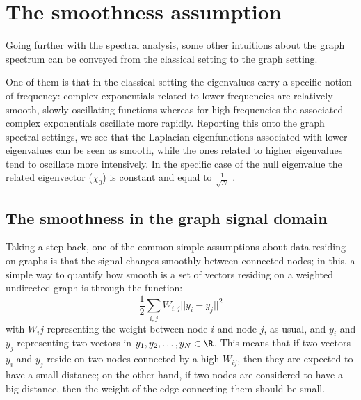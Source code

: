 \chapter{The smoothness assumption}
\label{ch:smoothness}
Going further with the spectral analysis, some other intuitions about the graph spectrum can be conveyed from the classical setting to the graph setting.

One of them is that in the classical setting the eigenvalues carry a specific notion of frequency: complex exponentials related to lower frequencies are relatively smooth, slowly oscillating functions whereas for high frequencies the associated complex exponentials oscillate more rapidly. Reporting this onto the graph spectral settings, we see that the Laplacian eigenfunctions associated with lower eigenvalues can be seen as smooth, while the ones related to higher eigenvalues tend to oscillate more intensively. \cite{Shuman2016} In the specific case of the null eigenvalue  the related eigenvector ($\chi_0$) is constant and equal to $\frac{1}{\sqrt{N}}$ \cite{Shuman2013}.
\section{The smoothness in the graph signal domain}
Taking a step back, one of the common simple assumptions about data residing on graphs is that the signal changes smoothly between connected nodes; in this, a simple way to quantify how smooth is a set of vectors residing on a weighted undirected graph is through the function:
\begin{equation}
\frac{1}{2} \sum_{i,j}W_{i,j}||y_i - y_j||^2
\label{eq:smooth}
\end{equation}
with $W_ij$ representing the weight between node $i$ and node $j$, as usual, and $y_i$ and $y_j$ representing two vectors in $y_1, y_2, \dots, y_N \in \R$. This means that if two vectors $y_i$ and $y_j$ reside on two nodes connected by a high $W_{ij}$, then they are expected to have a small distance; on the other hand, if two nodes are considered to have a big distance, then the weight of the edge connecting them should be small.

